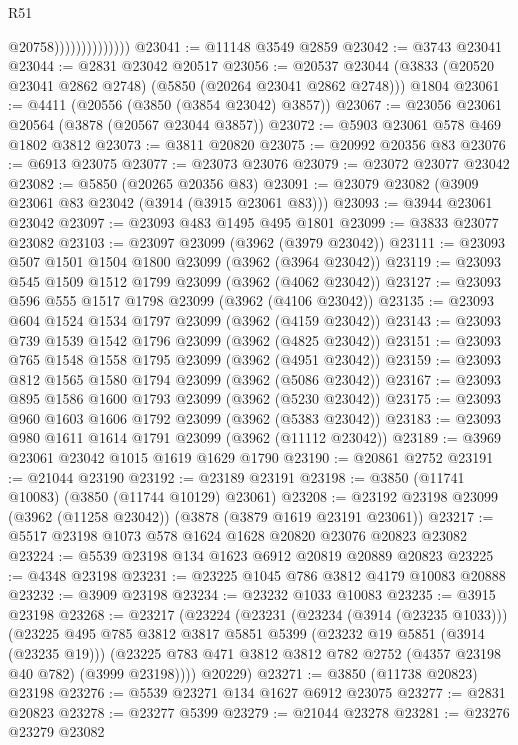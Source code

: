 \begin{lexlean}{R51}
\begin{coremodule}
                                @20758))))))))))))))
@23041 := @11148 @3549 @2859
@23042 := @3743 @23041
@23044 := @2831 @23042 @20517
@23056 := @20537
    @23044
    (@3833 (@20520 @23041 @2862 @2748) (@5850 (@20264 @23041 @2862 @2748)))
    @1804
@23061 := @4411 (@20556 (@3850 (@3854 @23042) @3857))
@23067 := @23056 @23061 @20564 (@3878 (@20567 @23044 @3857))
@23072 := @5903 @23061 @578 @469 @1802 @3812
@23073 := @3811 @20820
@23075 := @20992 @20356 @83
@23076 := @6913 @23075
@23077 := @23073 @23076
@23079 := @23072 @23077 @23042
@23082 := @5850 (@20265 @20356 @83)
@23091 := @23079 @23082 (@3909 @23061 @83 @23042 (@3914 (@3915 @23061 @83)))
@23093 := @3944 @23061 @23042
@23097 := @23093 @483 @1495 @495 @1801
@23099 := @3833 @23077 @23082
@23103 := @23097 @23099 (@3962 (@3979 @23042))
@23111 := @23093 @507 @1501 @1504 @1800 @23099 (@3962 (@3964 @23042))
@23119 := @23093 @545 @1509 @1512 @1799 @23099 (@3962 (@4062 @23042))
@23127 := @23093 @596 @555 @1517 @1798 @23099 (@3962 (@4106 @23042))
@23135 := @23093 @604 @1524 @1534 @1797 @23099 (@3962 (@4159 @23042))
@23143 := @23093 @739 @1539 @1542 @1796 @23099 (@3962 (@4825 @23042))
@23151 := @23093 @765 @1548 @1558 @1795 @23099 (@3962 (@4951 @23042))
@23159 := @23093 @812 @1565 @1580 @1794 @23099 (@3962 (@5086 @23042))
@23167 := @23093 @895 @1586 @1600 @1793 @23099 (@3962 (@5230 @23042))
@23175 := @23093 @960 @1603 @1606 @1792 @23099 (@3962 (@5383 @23042))
@23183 := @23093 @980 @1611 @1614 @1791 @23099 (@3962 (@11112 @23042))
@23189 := @3969 @23061 @23042 @1015 @1619 @1629 @1790
@23190 := @20861 @2752
@23191 := @21044 @23190
@23192 := @23189 @23191
@23198 := @3850 (@11741 @10083) (@3850 (@11744 @10129) @23061)
@23208 := @23192 @23198 @23099 (@3962 (@11258 @23042)) (@3878 (@3879 @1619 @23191 @23061))
@23217 := @5517 @23198 @1073 @578 @1624 @1628 @20820 @23076 @20823 @23082
@23224 := @5539 @23198 @134 @1623 @6912 @20819 @20889 @20823
@23225 := @4348 @23198
@23231 := @23225 @1045 @786 @3812 @4179 @10083 @20888
@23232 := @3909 @23198
@23234 := @23232 @1033 @10083
@23235 := @3915 @23198
@23268 := @23217
    (@23224
      (@23231
        (@23234 (@3914 (@23235 @1033)))
        (@23225
          @495
          @785
          @3812
          @3817
          @5851
          @5399
          (@23232 @19 @5851 (@3914 (@23235 @19)))
          (@23225 @783 @471 @3812 @3812 @782 @2752 (@4357 @23198 @40 @782) (@3999 @23198))))
      @20229)
@23271 := @3850 (@11738 @20823) @23198
@23276 := @5539 @23271 @134 @1627 @6912 @23075
@23277 := @2831 @20823
@23278 := @23277 @5399
@23279 := @21044 @23278
@23281 := @23276 @23279 @23082

\end{coremodule}
\end{lexlean}
